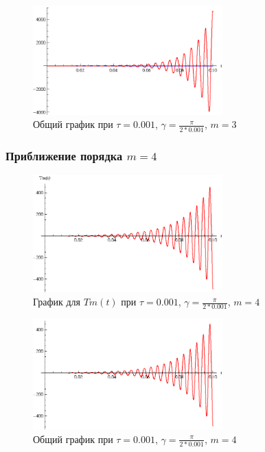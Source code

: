 \begin{figure}[h]
\begin{center}
\includegraphics[width=0.65\textwidth]{./3_results/5_7.eps}
\end{center}
\caption{Общий график при $\tau=0.001$, $\gamma = \frac{\pi}{2*0.001}$, $m=3$}
\end{figure}

\newpage

\subsubsection{Приближение порядка $m=4$}

\begin{figure}[h]
\begin{center}
\includegraphics[width=0.65\textwidth]{./3_results/5_8.eps}
\end{center}
\caption{График для $Tm(t)$ при $\tau=0.001$, $\gamma = \frac{\pi}{2*0.001}$, $m=4$}
\end{figure}

\begin{figure}[h]
\begin{center}
\includegraphics[width=0.65\textwidth]{./3_results/5_9.eps}
\end{center}
\caption{Общий график при $\tau=0.001$, $\gamma = \frac{\pi}{2*0.001}$, $m=4$}
\end{figure}

